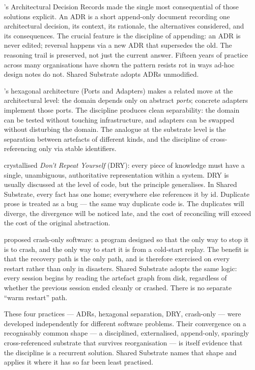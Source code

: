 \documentclass[11pt,a4paper,twocolumn]{article}
\begin{document}
\citet{nygard2011adr}'s Architectural Decision Records made the
single most consequential of those solutions explicit. An ADR is a
short append-only document recording one architectural decision, its
context, its rationale, the alternatives considered, and its
consequences. The crucial feature is the discipline of appending: an
ADR is never edited; reversal happens via a new ADR that supersedes
the old. The reasoning trail is preserved, not just the current
answer. Fifteen years of practice across many organisations have
shown the pattern resists rot in ways ad-hoc design notes do not.
Shared Substrate adopts ADRs unmodified.

\citet{cockburn2005hexagonal}'s hexagonal architecture (Ports and
Adapters) makes a related move at the architectural level: the
domain depends only on abstract \emph{ports}; concrete adapters
implement those ports. The discipline produces clean separability:
the domain can be tested without touching infrastructure, and
adapters can be swapped without disturbing the domain. The analogue
at the substrate level is the separation between artefacts of
different kinds, and the discipline of cross-referencing only via
stable identifiers.

\citet{hunt1999pragmatic} crystallised \emph{Don't Repeat Yourself}
(DRY): every piece of knowledge must have a single, unambiguous,
authoritative representation within a system. DRY is usually
discussed at the level of code, but the principle generalises. In
Shared Substrate, every fact has one home; everywhere else
references it by id. Duplicate prose is treated as a bug --- the
same way duplicate code is. The duplicates will diverge, the
divergence will be noticed late, and the cost of reconciling will
exceed the cost of the original abstraction.

\citet{candea2003crashonly} proposed crash-only software: a program
designed so that the only way to stop it is to crash, and the only
way to start it is from a cold-start replay. The benefit is that
the recovery path is the only path, and is therefore exercised on
every restart rather than only in disasters. Shared Substrate
adopts the same logic: every session begins by reading the artefact
graph from disk, regardless of whether the previous session ended
cleanly or crashed. There is no separate ``warm restart'' path.

These four practices --- ADRs, hexagonal separation, DRY,
crash-only --- were developed independently for different software
problems. Their convergence on a recognisably common shape --- a
disciplined, externalised, append-only, sparingly cross-referenced
substrate that survives reorganisation --- is itself evidence that
the discipline is a recurrent solution. Shared Substrate
names that shape and applies it where it has so far been least
practised.
\end{document}
